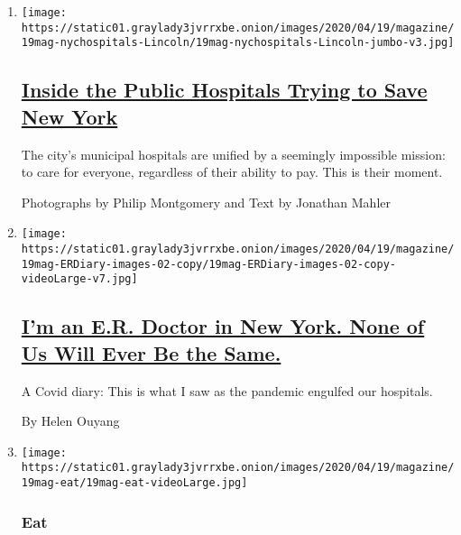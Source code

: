 \begin{enumerate}
\def\labelenumi{\arabic{enumi}.}
\item
  \texttt{[image: https://static01.graylady3jvrrxbe.onion/images/2020/04/19/magazine/19mag-nychospitals-Lincoln/19mag-nychospitals-Lincoln-jumbo-v3.jpg]}

  \hypertarget{inside-the-public-hospitals-trying-to-save-new-york}{%
  \subsection{\texorpdfstring{\href{/interactive/2020/04/15/magazine/new-york-hospitals.html}{Inside
  the Public Hospitals Trying to Save New
  York}}{Inside the Public Hospitals Trying to Save New York}}\label{inside-the-public-hospitals-trying-to-save-new-york}}

  The city's municipal hospitals are unified by a seemingly impossible
  mission: to care for everyone, regardless of their ability to pay.
  This is their moment.

  Photographs by Philip Montgomery and Text by Jonathan Mahler
\item
  \texttt{[image: https://static01.graylady3jvrrxbe.onion/images/2020/04/19/magazine/19mag-ERDiary-images-02-copy/19mag-ERDiary-images-02-copy-videoLarge-v7.jpg]}

  \hypertarget{im-an-er-doctor-in-new-york-none-of-us-will-ever-be-the-same}{%
  \subsection{\texorpdfstring{\href{/2020/04/14/magazine/coronavirus-er-doctor-diary-new-york-city.html}{I'm
  an E.R. Doctor in New York. None of Us Will Ever Be the
  Same.}}{I'm an E.R. Doctor in New York. None of Us Will Ever Be the Same.}}\label{im-an-er-doctor-in-new-york-none-of-us-will-ever-be-the-same}}

  A Covid diary: This is what I saw as the pandemic engulfed our
  hospitals.

  By Helen Ouyang
\item
  \texttt{[image: https://static01.graylady3jvrrxbe.onion/images/2020/04/19/magazine/19mag-eat/19mag-eat-videoLarge.jpg]}

  \hypertarget{eat}{%
  \subsubsection{Eat}\label{eat}}

  \hypertarget{your-quarantine-cooking-needs-condiments}{%
}
\end{enumerate}
